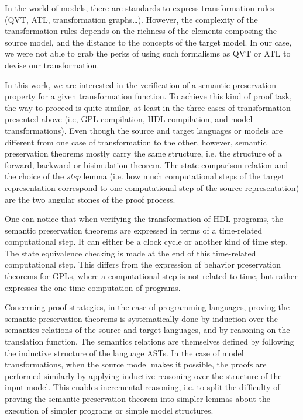 \documentclass[pdflatex,sn-mathphys]{sn-jnl}%
\theoremstyle{thmstyleone}%
\theoremstyle{thmstyletwo}%
\theoremstyle{thmstylethree}%
\begin{document}
In the world of models, there are standards to express transformation
rules (QVT, ATL, transformation graphs\dots).  However, the complexity
of the transformation rules depends on the richness of the elements
composing the source model, and the distance to the concepts of the
target model. In our case, we were not able to grab the perks of using
such formalisms as QVT or ATL to devise our transformation.

In this work, we are interested in the verification of a semantic
preservation property for a given transformation function. To achieve
this kind of proof task, the way to proceed is quite similar, at least
in the three cases of transformation presented above (i.e, GPL
compilation, HDL compilation, and model transformations). Even though
the source and target languages or models are different from one case
of transformation to the other, however, semantic preservation
theorems mostly carry the same structure, i.e. the structure of a
forward, backward or bisimulation theorem. The state comparison
relation and the choice of the \textit{step} lemma (i.e. how much
computational steps of the target representation correspond to one
computational step of the source representation) are the two angular
stones of the proof process.

One can notice that when verifying the transformation of HDL programs,
the semantic preservation theorems are expressed in terms of a
time-related computational step. It can either be a clock cycle or
another kind of time step. The state equivalence checking is made at
the end of this time-related computational step. This differs from the
expression of behavior preservation theorems for GPLs, where a
computational step is not related to time, but rather expresses the
one-time computation of programs.

Concerning proof strategies, in the case of programming languages,
proving the semantic preservation theorems is systematically done by
induction over the semantics relations of the source and target
languages, and by reasoning on the translation function. The semantics
relations are themselves defined by following the inductive structure
of the language ASTs. In the case of model transformations, when the
source model makes it possible, the proofs are performed similarly by
applying inductive reasoning over the structure of the input model.
This enables incremental reasoning, i.e. to split the difficulty of
proving the semantic preservation theorem into simpler lemmas about
the execution of simpler programs or simple model structures.
\end{document}

